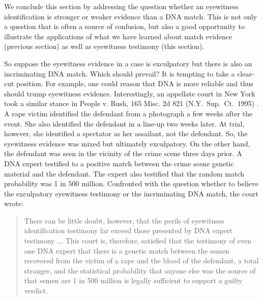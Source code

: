 \documentclass[
  10pt,
  dvipsnames,enabledeprecatedfontcommands]{scrartcl}
\begin{document}
We conclude this section by addressing the question whether an
eyewitness identification is stronger or weaker evidence than a DNA
match. This is not only a question that is often a source of confusion,
but also a good opportunity to illustrate the applications of what we
have learned about match evidence (previous section) as well as
eyewitness testimony (this section).

So suppose the eyewitness evidence in a case is exculpatory but there is
also an incriminating DNA match. Which should prevail? It is tempting to
take a clear-cut position. For example, one could reason that DNA is
more reliable and thus should trump eyewitness evidence. Interestingly,
an appellate court in New York took a similar stance in People v. Rush,
165 Misc. 2d 821 (N.Y.~Sup.~Ct.~1995) . A rape victim identified the
defendant from a photograph a few weeks after the event. She also
identified the defendant in a line-up two weeks later. At trial,
however, she identified a spectator as her assailant, not the defendant.
So, the eyewitness evidence was mixed but ultimately exculpatory. On the
other hand, the defendant was seen in the vicinity of the crime scene
three days prior. A DNA expert testified to a positive match between the
crime scene genetic material and the defendant. The expert also
testified that the random match probability was 1 in 500 million.
Confronted with the question whether to believe the exculpatory
eyewitness testimony or the incriminating DNA match, the court wrote:

\begin{quote}
There can be little doubt, however, that the perils of eyewitness identification testimony far exceed those presented by DNA expert testimony ... This court is, therefore, satisfied that the testimony of even one DNA expert that there is a genetic match between the semen recovered from the victim of a rape and the blood of the defendant, a total stranger, and the statistical probability that anyone else was the source of that semen are 1 in 500 million is legally sufficient to support a guilty verdict.
\end{quote}

\noindent
\end{document}
